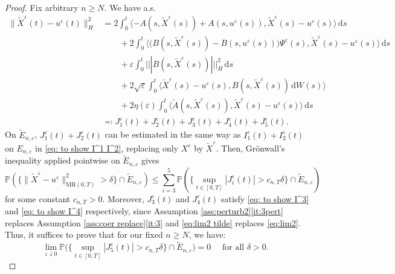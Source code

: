 \documentclass{amsart}
\newcommand{\dd}{\,\mathrm{d}}
\renewcommand{\MR}{\mathrm{MR}}
\newcommand{\<}{\langle}
\newcommand{\?}{\rangle}
\newcommand{\nn}{|\!|\!|}
\theoremstyle{plain}
\theoremstyle{remark}
\theoremstyle{plain}
\numberwithin{equation}{section}
\renewcommand{\P}{\mathbb{P}}
\newcommand{\eps}{\varepsilon}
\begin{document}
\begin{proof}
Fix arbitrary $n\geq N$. We have a.s.\ 
  \begin{align*}
       \|\tilde{X}^\eps(t)-u^{\eps}(t)\|_H^2
    &=2\int_0^t\<-A(s,\tilde{X}^\eps(s))+A(s,u^{\eps}(s)),\tilde{X}^\eps(s)-u^{\eps}(s)\?\dd s\\
    &\qquad+2\int_0^t\<\big(B(s,\tilde{X}^\eps(s))-B(s,u^{\eps}(s))\big)\Psi^\eps(s),\tilde{X}^\eps(s)-u^{\eps}(s)\?\dd s\\
    &\qquad+\eps\int_0^t \nn B(s,\tilde{X}^\eps(s))\nn_H^2\dd s\\
    &\qquad+2\sqrt{\eps}\int_0^t \<\tilde{X}^\eps(s)-u^{\eps}(s),B(s,\tilde{X}^\eps(s))\dd W(s)\?\\
    &\qquad+2\eta(\eps)\int_0^t\big\<\tilde{A}(s,\tilde{X}^\eps(s)),\tilde{X}^\eps(s)-u^{\eps}(s)\big\?\dd s\\
    &\eqqcolon J_1^\eps(t)+J_2^\eps(t)+J_3^\eps(t)+J_4^\eps(t)+J_5^\eps(t).
  \end{align*} 
  On $\tilde{E}_{n,\eps}$,  $J_1^\eps(t)+J_2^\eps(t)$ can be estimated in the same way as $I_1^\eps(t)+I_2^\eps(t)$ on $E_{n,\eps}$ in \eqref{eq: to show I^1 I^2}, replacing only $X^\eps$ by $\tilde{X}^\eps$. Then, Gr\"onwall's inequality applied pointwise on $\tilde{E}_{n,\eps}$ gives 
  \[
    \P(\{\|\tilde{X}^\eps- u^{\eps}\|_{\MR(0,T)}^2>\delta\}\cap \tilde{E}_{n,\eps})\leq \sum_{i=3}^5\P(\{\sup_{t\in[0,T]}|{J}_i^\eps(t)|>c_{n,T}{\delta}\}\cap \tilde{E}_{n,\eps}) 
  \]
  for some constant $c_{n,T}>0$. 
  Moreover, 
  $J_3^\eps(t)$ and $J_4^\eps(t)$ satisfy \eqref{eq: to show I^3} and \eqref{eq: to show I^4} respectively, 
  since  Assumption \ref{ass:perturb2}\ref{it:3pert} replaces Assumption \ref{ass:coer replace}\ref{it:3}  and \eqref{eq:lim2 tilde} replaces \eqref{eq:lim2}. 
   Thus,  it suffices to prove that for our fixed $n\geq N$, we have:
\begin{equation}\label{eq:to show J^5}
 \lim_{\eps\downarrow 0}  \P\big(\big\{\sup_{t\in[0,T]}|J_5^\eps(t)|>c_{n,T}\delta\big\} \cap \tilde{E}_{n,\eps}\big)=0 \quad \text{ for all $\delta>0$. }
\end{equation} 
  

\end{proof}
\end{document}
